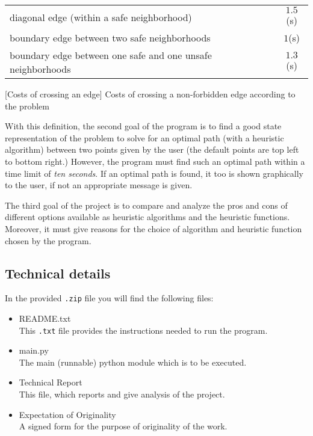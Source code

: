 \documentclass[11pt]{article}
\begin{document}
			\begin{center}
				\setlength\arrayrulewidth{0.8pt}
				\begin{tabular}{ | l | c | }
					\hline
					\rowcolor{lightgray}
					\multicolumn{2}{|c|}{\bfseries Edge crossing costs}\\
					\hline
					
					\hline
					diagonal edge (within a safe neighborhood) & $1.5$(s)\\
					\hline
					boundary edge between two safe neighborhoods & $1$(s)\\
					\hline
					boundary edge between one safe and one unsafe neighborhoods & $1.3$(s)\\
					\hline
				\end{tabular}
				[Costs of crossing an edge]
				{Costs of crossing a non-forbidden edge according to the problem}
				\label{table:edgeCosts}
			\end{center}
			
			With this definition, the second goal of the program is to find a good state representation of the problem to solve for an optimal path (with a heuristic algorithm) between two
			points given by the user (the default points are top left to bottom right.) However, the program must find such an optimal path within a time limit of \emph{ten seconds}. If an
			optimal path is found, it too is shown graphically to the user, if not an appropriate message is given.
			
			The third goal of the project is to compare and analyze the pros and cons of different options available as heuristic algorithms and the heuristic functions. Moreover, it must give
			reasons for the choice of algorithm and heuristic function chosen by the program.
			
		\subsection{Technical details}
			In the provided \texttt{.zip} file you will find the following files:
			\begin{itemize}
				\item {\ttfamily README.txt}\\
					This \texttt{.txt} file provides the instructions needed to run the program.
				\item {\ttfamily main.py}\\
					The main (runnable) python module which is to be executed.
				\item {\ttfamily Technical Report}\\
					This file, which reports and give analysis of the project.
				\item {\ttfamily Expectation of Originality}\\
					A signed form for the purpose of originality of the work.
			\end{itemize}
			
\end{document}
